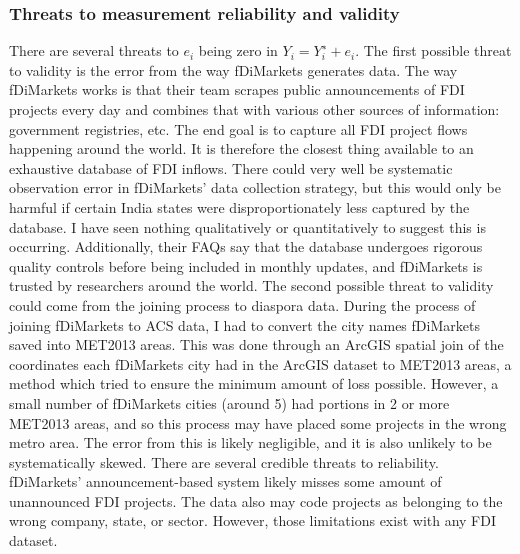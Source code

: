 \documentclass[12pt]{article}
\begin{document}
    \subsubsection{Threats to measurement reliability and validity} \label{FDI threats}
        There are several threats to $e_i$ being zero in $Y_i=Y_i^∗+e_i$. The first possible threat to validity is the error from the way fDiMarkets generates data. The way fDiMarkets works is that their team scrapes public announcements of FDI projects every day and combines that with various other sources of information: government registries, etc. The end goal is to capture all FDI project flows happening around the world. It is therefore the closest thing available to an exhaustive database of FDI inflows. There could very well be systematic observation error in fDiMarkets' data collection strategy, but this would only be harmful if certain India states were disproportionately less captured by the database. I have seen nothing qualitatively or quantitatively to suggest this is occurring. Additionally, their FAQs say that the database undergoes rigorous quality controls before being included in monthly updates, and fDiMarkets is trusted by researchers around the world.
        The second possible threat to validity could come from the joining process to diaspora data. During the process of joining fDiMarkets to ACS data, I had to convert the city names fDiMarkets saved into MET2013 areas. This was done through an ArcGIS spatial join of the coordinates each fDiMarkets city had in the ArcGIS dataset to MET2013 areas, a method which tried to ensure the minimum amount of loss possible. However, a small number of fDiMarkets cities (around 5) had portions in 2 or more MET2013 areas, and so this process may have placed some projects in the wrong metro area. The error from this is likely negligible, and it is also unlikely to be systematically skewed.
    There are several credible threats to reliability. fDiMarkets' announcement-based system likely misses some amount of unannounced FDI projects. The data also may code projects as belonging to the wrong company, state, or sector. However, those limitations exist with any FDI dataset.
        
\end{document}
